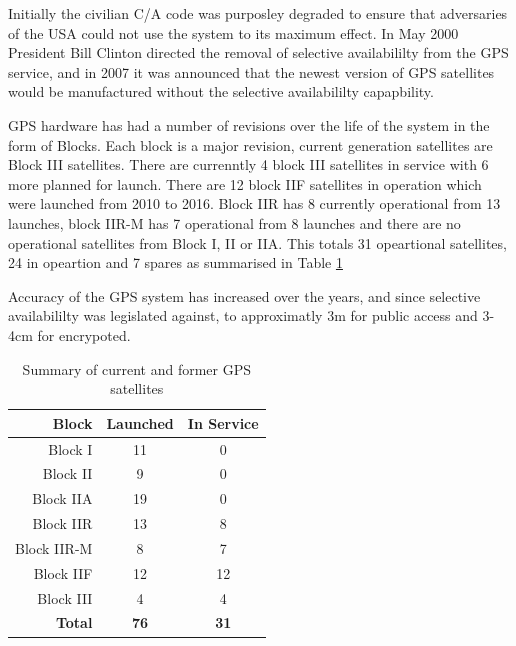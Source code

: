 Initially the civilian C/A code was purposley degraded to ensure that adversaries of the USA could not use the system to its maximum effect. In May 2000 President Bill
Clinton directed the removal of selective availabililty from the GPS service, and in 2007 it was announced that the newest version of GPS satellites would be manufactured
without the selective availabililty capapbility.

GPS hardware has had a number of revisions over the life of the system in the form of Blocks. Each block is a major revision, current generation satellites are Block III
satellites. There are currenntly 4 block III satellites in service with 6 more planned for launch. There are 12 block IIF satellites in operation which were launched from
2010 to 2016. Block IIR has 8 currently operational from 13 launches, block IIR-M has 7 operational from 8 launches and there are no operational satellites from Block I,
II or IIA. This totals 31 opeartional satellites, 24 in opeartion and 7 spares as summarised in Table \ref{tab:GPSSatSum}

Accuracy of the GPS system has increased over the years, and since selective availabililty was legislated against, to approximatly 3m for public access and 3-4cm for encrypoted.

\renewcommand{\arraystretch}{1.5}
\begin{table}
    \begin{center}
        \caption{Summary of current and former GPS satellites}
        \label{tab:GPSSatSum}
        \begin{tabular}{ |r|c|c| }
            \hline
            \textbf{Block} & \textbf{Launched} & \textbf{In Service} \\
            \hline
            Block I & 11 & 0\\
            \hline
            Block II & 9 & 0\\
            \hline
            Block IIA & 19 & 0\\
            \hline
            Block IIR & 13 & 8\\
            \hline
            Block IIR-M & 8 & 7\\
            \hline
            Block IIF & 12 & 12\\
            \hline
            Block III & 4 & 4\\
            \hline
            \hline
            \textbf{Total} & \textbf{76} & \textbf{31}\\
            \hline
        \end{tabular}
    \end{center}
\end{table}
\renewcommand{\arraystretch}{1}

